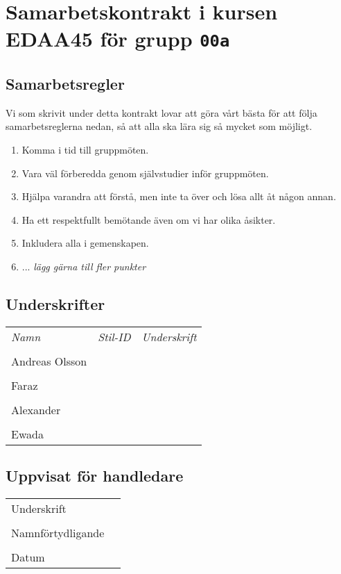 \documentclass[12pt]{article}
\begin{document}
\clearpage\thispagestyle{empty}

\section*{Samarbetskontrakt i kursen EDAA45 för grupp \texttt{00a}}
\subsection*{Samarbetsregler}
Vi som skrivit under detta kontrakt lovar att göra vårt bästa för att följa samarbetsreglerna nedan, så att alla ska lära sig så mycket som möjligt. 
\begin{enumerate}
\item Komma i tid till gruppmöten.
\item Vara väl förberedda genom självstudier inför gruppmöten.
\item Hjälpa varandra att förstå, men inte ta över och lösa allt åt någon annan.
\item Ha ett respektfullt bemötande även om vi har olika åsikter.
\item Inkludera alla i gemenskapen.
\item ... \emph{lägg gärna till fler punkter}
\end{enumerate}

\subsection*{Underskrifter}
\vspace{1em}

\begin{tabular}{l l p{7cm}}
\emph{Namn} & \emph{Stil-ID} & \emph{Underskrift} \\
\\ Andreas Olsson &  & \dotfill \\
\\ Faraz &  & \dotfill \\
\\ Alexander &  & \dotfill \\
\\  Ewada &  & \dotfill \\

\end{tabular}

\vspace{1em }
\subsection*{Uppvisat för handledare}

\begin{tabular}{l p{8cm}}
\\ Underskrift &  \dotfill \\
\\ Namnförtydligande &  \dotfill \\
\\ Datum & \dotfill \\
\end{tabular}
\end{document}
